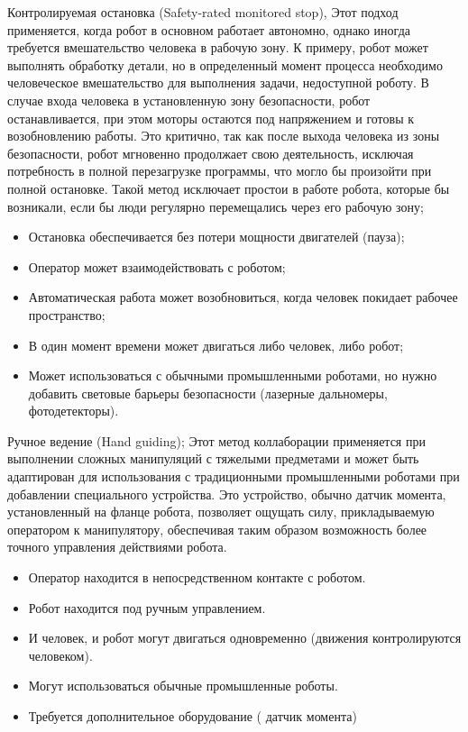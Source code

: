 Контролируемая остановка (Safety-rated monitored stop), Этот подход применяется, когда робот в основном работает автономно, однако иногда требуется вмешательство человека в рабочую зону. К примеру, робот может выполнять обработку детали, но в определенный момент процесса необходимо человеческое вмешательство для выполнения задачи, недоступной роботу. В случае входа человека в установленную зону безопасности, робот останавливается, при этом моторы остаются под напряжением и готовы к возобновлению работы. Это критично, так как после выхода человека из зоны безопасности, робот мгновенно продолжает свою деятельность, исключая потребность в полной перезагрузке программы, что могло бы произойти при полной остановке. Такой метод исключает простои в работе робота, которые бы возникали, если бы люди регулярно перемещались через его рабочую зону;
\begin{itemize}
\item Остановка обеспечивается без потери мощности двигателей (пауза);
\item Оператор может взаимодействовать с роботом;
\item Автоматическая работа может возобновиться, когда человек покидает рабочее пространство;
\item В один момент времени может двигаться либо человек, либо робот;
\item Может использоваться с обычными промышленными роботами, но нужно добавить световые барьеры безопасности (лазерные дальномеры, фотодетекторы).
\end{itemize}

Ручное ведение (Hand guiding);
Этот метод коллаборации применяется при выполнении сложных манипуляций с тяжелыми предметами и может быть адаптирован для использования с традиционными промышленными роботами при добавлении специального устройства. Это устройство, обычно датчик момента, установленный на фланце робота, позволяет ощущать силу, прикладываемую оператором к манипулятору, обеспечивая таким образом возможность более точного управления действиями робота.

\begin{itemize}
	\item Оператор находится в непосредственном контакте с роботом.
	\item Робот находится под ручным управлением.
	\item И человек, и робот могут двигаться одновременно (движения контролируются человеком).
	\item Могут использоваться обычные промышленные роботы.
	\item Требуется дополнительное оборудование ( датчик момента)
\end{itemize}

